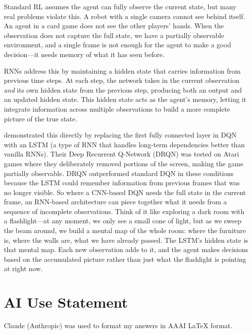 \documentclass[letterpaper]{article}
\begin{document}
\vspace{0.5em}

Standard RL assumes the agent can fully observe the current state, but many real problems violate this. A robot with a single camera cannot see behind itself. An agent in a card game does not see the other players' hands. When the observation does not capture the full state, we have a partially observable environment, and a single frame is not enough for the agent to make a good decision---it needs memory of what it has seen before.

RNNs address this by maintaining a hidden state that carries information from previous time steps. At each step, the network takes in the current observation \textit{and} its own hidden state from the previous step, producing both an output and an updated hidden state. This hidden state acts as the agent's memory, letting it integrate information across multiple observations to build a more complete picture of the true state.

\citet{hausknecht2015deep} demonstrated this directly by replacing the first fully connected layer in DQN with an LSTM (a type of RNN that handles long-term dependencies better than vanilla RNNs). Their Deep Recurrent Q-Network (DRQN) was tested on Atari games where they deliberately removed portions of the screen, making the game partially observable. DRQN outperformed standard DQN in these conditions because the LSTM could remember information from previous frames that was no longer visible. So where a CNN-based DQN needs the full state in the current frame, an RNN-based architecture can piece together what it needs from a sequence of incomplete observations. Think of it like exploring a dark room with a flashlight---at any moment, we only see a small cone of light, but as we sweep the beam around, we build a mental map of the whole room: where the furniture is, where the walls are, what we have already passed. The LSTM's hidden state is that mental map. Each new observation adds to it, and the agent makes decisions based on the accumulated picture rather than just what the flashlight is pointing at right now.

\section*{AI Use Statement}

Claude (Anthropic) was used to format my answers in AAAI LaTeX format.


\end{document}
